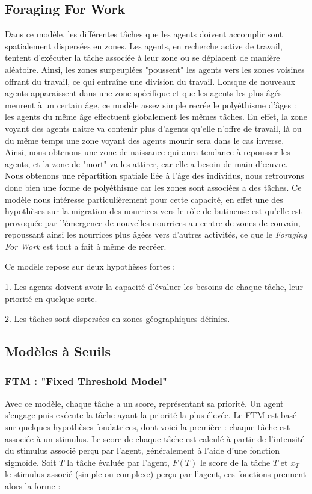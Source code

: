 		\subsection{Foraging For Work  \cite{franks_foraging_1994}}
        Dans ce modèle, les différentes tâches que les agents doivent accomplir sont spatialement dispersées en zones. Les agents, en recherche active de travail, tentent d'exécuter la tâche associée à leur zone ou se déplacent de manière aléatoire. Ainsi, les zones surpeuplées "poussent" les agents vers les zones voisines offrant du travail, ce qui entraîne une division du travail. Lorsque de nouveaux agents apparaissent dans une zone spécifique et que les agents les plus âgés meurent à un certain âge, ce modèle assez simple recrée le polyéthisme d'âges : les agents du même âge effectuent globalement les mêmes tâches. En effet, la zone voyant des agents naitre va contenir plus d'agents qu'elle n'offre de travail, là ou du même temps une zone voyant des agents mourir sera dans le cas inverse. Ainsi, nous obtenons une zone de naissance qui aura tendance à repousser les agents, et la zone de "mort" va les attirer, car elle a besoin de main d'œuvre. Nous obtenons une répartition spatiale liée à l'âge des individus, nous retrouvons donc bien une forme de polyéthisme car les zones sont associées a des tâches. Ce modèle nous intéresse particulièrement pour cette capacité, en effet une des hypothèses sur la migration des nourrices vers le rôle de butineuse est qu'elle est provoquée par l'émergence de nouvelles nourrices au centre de zones de couvain, repoussant ainsi les nourrices plus âgées vers d'autres activités, ce que le \textit{Foraging For Work} est tout a fait à même de recréer.
        
        Ce modèle repose sur deux hypothèses fortes :
        
        1. Les agents doivent avoir la capacité d'évaluer les besoins de chaque tâche, leur priorité en quelque sorte. 
        
        2. Les tâches sont dispersées en zones géographiques définies.
        
        
		\subsection{Modèles à Seuils}
		\label{subsectionRTM}
		\subsubsection{FTM : "Fixed Threshold Model" \cite{bonabeau_natural_1999}}
        Avec ce modèle, chaque tâche a un score, représentant sa priorité. Un agent s'engage puis exécute la tâche ayant la priorité la plus élevée. Le FTM est basé sur quelques hypothèses fondatrices, dont voici la première : chaque tâche est associée à un stimulus. Le score de chaque tâche est calculé à partir de l'intensité du stimulus associé perçu par l'agent, généralement à l'aide d'une fonction sigmoïde. Soit $T$ la tâche évaluée par l'agent, $F(T)$ le score de la tâche $T$ et $x_T$ le stimulus associé (simple ou complexe) perçu par l'agent, ces fonctions prennent alors la forme :
			
